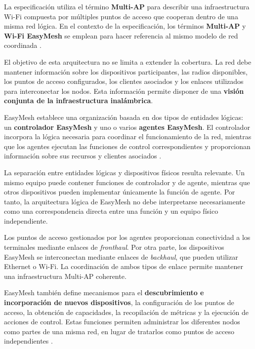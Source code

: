 La especificación utiliza el término \textbf{Multi-AP} para describir una
infraestructura Wi-Fi compuesta por múltiples puntos de acceso que
cooperan dentro de una misma red lógica. En el contexto de la
especificación, los términos \textbf{Multi-AP} y
\textbf{Wi-Fi EasyMesh} se emplean para hacer referencia al mismo modelo
de red coordinada \cite{wifi_alliance_easymesh}.

El objetivo de esta arquitectura no se limita a extender la cobertura.
La red debe mantener información sobre los dispositivos participantes,
las radios disponibles, los puntos de acceso configurados, los clientes
asociados y los enlaces utilizados para interconectar los nodos. Esta
información permite disponer de una
\textbf{visión conjunta de la infraestructura inalámbrica}.

EasyMesh establece una organización basada en dos tipos de entidades
lógicas: un \textbf{controlador EasyMesh} y uno o varios
\textbf{agentes EasyMesh}. El controlador incorpora la lógica necesaria
para coordinar el funcionamiento de la red, mientras que los agentes
ejecutan las funciones de control correspondientes y proporcionan
información sobre sus recursos y clientes asociados
\cite{wifi_alliance_easymesh}.

La separación entre entidades lógicas y dispositivos físicos resulta
relevante. Un mismo equipo puede contener funciones de controlador y de
agente, mientras que otros dispositivos pueden implementar únicamente la
función de agente. Por tanto, la arquitectura lógica de EasyMesh no debe
interpretarse necesariamente como una correspondencia directa entre una
función y un equipo físico independiente.

Los puntos de acceso gestionados por los agentes proporcionan
conectividad a los terminales mediante enlaces de
\textit{fronthaul}. Por otra parte, los dispositivos EasyMesh se
interconectan mediante enlaces de \textit{backhaul}, que pueden utilizar
Ethernet o Wi-Fi. La coordinación de ambos tipos de enlace permite
mantener una infraestructura Multi-AP coherente.

EasyMesh también define mecanismos para el
\textbf{descubrimiento e incorporación de nuevos dispositivos}, la
configuración de los puntos de acceso, la obtención de capacidades, la
recopilación de métricas y la ejecución de acciones de control. Estas
funciones permiten administrar los diferentes nodos como partes de una
misma red, en lugar de tratarlos como puntos de acceso independientes
\cite{wifi_alliance_easymesh}.

